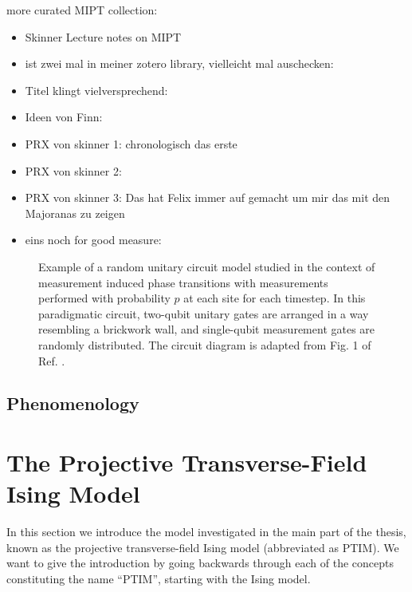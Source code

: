 more curated MIPT collection:
\begin{itemize}
  \item Skinner Lecture notes on MIPT
    \cite{skinnerLectureNotesIntroduction2023}
  \item ist zwei mal in meiner zotero library, vielleicht mal auschecken: 
    \cite{hokeMeasurementinducedEntanglementTeleportation2023}
  \item Titel klingt vielversprechend: \cite{baoTheoryPhaseTransition2020}
  \item Ideen von Finn: \cite{joshiObservingQuantumMpemba2024,aresEntanglementAsymmetryProbe2023}
  \item PRX von skinner 1: \cite{skinnerMeasurementInducedPhaseTransitions2019}
    chronologisch das erste
  \item PRX von skinner 2: \cite{nahumMeasurementEntanglementPhase2021}
  \item PRX von skinner 3:
    \cite{nahumEntanglementDynamicsDiffusionannihilation2020}
    Das hat Felix immer auf gemacht um mir das mit den Majoranas zu zeigen
  \item eins noch for good measure:
    \cite{yoshidaDecodingEntanglementStructure2021}
\end{itemize}
%  
\begin{figure}[t]
  \centering
  
  \caption{Example of a random unitary circuit model studied in the context of
    measurement induced phase transitions with measurements
  performed with probability $p$ at each site for each timestep.
  In this paradigmatic
circuit, two-qubit unitary gates are arranged in a way resembling a brickwork
wall, and single-qubit measurement gates are randomly distributed. The circuit
diagram is adapted from Fig. 1 of Ref.
\cite{liMeasurementdrivenEntanglementTransition2019}.}
  \label{fig:hybrid-circuit}
\end{figure}

\subsection{Phenomenology}

\clearpage
\section{The Projective Transverse-Field Ising Model}\label{sec:intro-ptim}
In this section we introduce the model investigated in the main part of the
thesis, known as the projective transverse-field Ising model (abbreviated as
PTIM). We want to give the introduction by going backwards through each of the
concepts constituting the name \enquote{PTIM}, starting with the Ising model.
